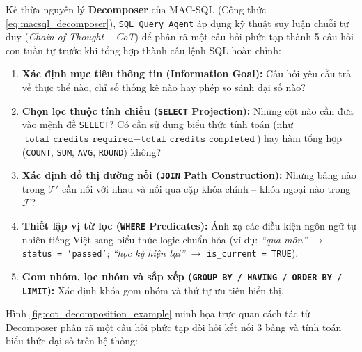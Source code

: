 \documentclass[12pt,a4paper]{report}
\begin{document}
Kế thừa nguyên lý \textbf{Decomposer} của MAC-SQL (Công thức \ref{eq:macsql_decomposer}), \texttt{SQL Query Agent} áp dụng kỹ thuật suy luận chuỗi tư duy (\textit{Chain-of-Thought -- CoT}) để phân rã một câu hỏi phức tạp thành 5 câu hỏi con tuần tự trước khi tổng hợp thành câu lệnh SQL hoàn chỉnh:
\begin{enumerate}
    \item \textbf{Xác định mục tiêu thông tin (Information Goal):} Câu hỏi yêu cầu trả về thực thể nào, chỉ số thống kê nào hay phép so sánh đại số nào?
    \item \textbf{Chọn lọc thuộc tính chiếu (\texttt{SELECT} Projection):} Những cột nào cần đưa vào mệnh đề \texttt{SELECT}? Có cần sử dụng biểu thức tính toán (như $\texttt{total\_credits\_required} - \texttt{total\_credits\_completed}$) hay hàm tổng hợp (\texttt{COUNT}, \texttt{SUM}, \texttt{AVG}, \texttt{ROUND}) không?
    \item \textbf{Xác định đồ thị đường nối (\texttt{JOIN} Path Construction):} Những bảng nào trong $\mathcal{T}'$ cần nối với nhau và nối qua cặp khóa chính -- khóa ngoại nào trong $\mathcal{F}$?
    \item \textbf{Thiết lập vị từ lọc (\texttt{WHERE} Predicates):} Ánh xạ các điều kiện ngôn ngữ tự nhiên tiếng Việt sang biểu thức logic chuẩn hóa (ví dụ: \textit{``qua môn''} $\rightarrow$ \texttt{status = 'passed'}; \textit{``học kỳ hiện tại''} $\rightarrow$ \texttt{is\_current = TRUE}).
    \item \textbf{Gom nhóm, lọc nhóm và sắp xếp (\texttt{GROUP BY / HAVING / ORDER BY / LIMIT}):} Xác định khóa gom nhóm và thứ tự ưu tiên hiển thị.
\end{enumerate}

Hình \ref{fig:cot_decomposition_example} minh họa trực quan cách tác tử Decomposer phân rã một câu hỏi phức tạp đòi hỏi kết nối 3 bảng và tính toán biểu thức đại số trên hệ thống:
\end{document}
